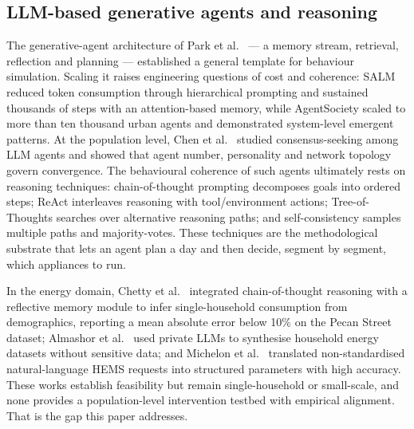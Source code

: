 \documentclass[11pt]{article}
\begin{document}
\subsection{LLM-based generative agents and reasoning}
The generative-agent architecture of Park et al.\ \cite{park2023} --- a memory stream, retrieval,
reflection and planning --- established a general template for behaviour simulation. Scaling it raises
engineering questions of cost and coherence: SALM \cite{koley2025} reduced token consumption through
hierarchical prompting and sustained thousands of steps with an attention-based memory, while
AgentSociety \cite{piao2025} scaled to more than ten thousand urban agents and demonstrated system-level
emergent patterns. At the population level, Chen et al.\ \cite{chen2025} studied consensus-seeking among
LLM agents and showed that agent number, personality and network topology govern convergence. The
behavioural coherence of such agents ultimately rests on reasoning techniques: chain-of-thought prompting
\cite{wei2022} decomposes goals into ordered steps; ReAct \cite{yao2023a} interleaves reasoning with
tool/environment actions; Tree-of-Thoughts \cite{yao2023b} searches over alternative reasoning paths; and
self-consistency \cite{wang2023} samples multiple paths and majority-votes. These techniques are the
methodological substrate that lets an agent plan a day and then decide, segment by segment, which
appliances to run.

In the energy domain, Chetty et al.\ \cite{chetty2025} integrated chain-of-thought reasoning with a
reflective memory module to infer single-household consumption from demographics, reporting a mean
absolute error below 10\% on the Pecan Street dataset; Almashor et al.\ \cite{almashor2024} used private
LLMs to synthesise household energy datasets without sensitive data; and Michelon et al.\
\cite{michelon2025} translated non-standardised natural-language HEMS requests into structured parameters
with high accuracy. These works establish feasibility but remain single-household or small-scale, and none
provides a population-level intervention testbed with empirical alignment. That is the gap this paper
addresses.
\end{document}
